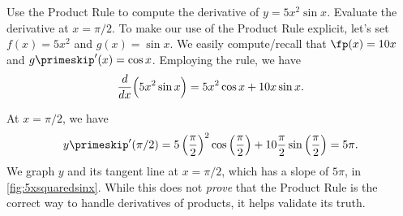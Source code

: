 \begin{example}\label{ex_prod1}
Use the Product Rule to compute the derivative of $y=5x^2\sin x$. Evaluate the derivative at $x=\pi/2$.
\solution
To make our use of the Product Rule explicit, let's set $f(x) = 5x^2$ and $g(x) = \sin x$. We easily compute/recall that $\fp(x) = 10x$ and $g\primeskip'(x) = \cos x$. Employing the rule, we have
\[\frac{d}{dx}\Bigl(5x^2\sin x\Bigr) = 5x^2\cos x + 10x\sin x.\]


At $x=\pi/2$, we have
\[y\primeskip'(\pi/2) = 5\left(\frac{\pi}{2}\right)^2\cos \left(\frac{\pi}2\right) + 10\frac{\pi}2 \sin\left(\frac{\pi}{2}\right) = 5\pi.\]
We graph $y$ and its tangent line at $x=\pi/2$, which has a slope of $5\pi$, in \autoref{fig:5xsquaredsinx}. While this does not \emph{prove} that the Product Rule is the correct way to handle derivatives of products, it helps validate its truth.
\end{example}

